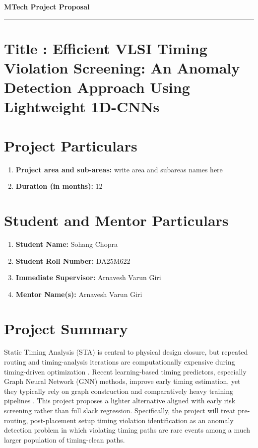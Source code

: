 \documentclass[12pt,a4paper]{article}
\begin{document}
\begin{center}
\textbf{MTech Project Proposal}
\end{center}

\par\noindent\rule{\textwidth}{0.5pt}

\vspace{\baselineskip}
\section{Title : \textnormal{Efficient VLSI Timing Violation Screening: An Anomaly Detection Approach Using Lightweight 1D-CNNs}}

\section{Project Particulars}
\begin{enumerate} [label=(\Alph*)]
    \item \textbf{Project area and sub-areas:}  write area and subareas names here
   \item \textbf{Duration (in months):} 12
\end{enumerate} 


\section{Student and Mentor Particulars}
\begin{enumerate} [label=(\Alph*)]
    \item \textbf{Student Name:} Sohang Chopra
    \item \textbf{Student Roll Number:} DA25M622
    \item \textbf{Immediate Supervisor:} Arnavesh Varun Giri
    \item \textbf{Mentor Name(s):} Arnavesh Varun Giri
\end{enumerate} 
\section{Project Summary}

Static Timing Analysis (STA) is central to physical design closure, but repeated routing and timing-analysis iterations are computationally expensive during timing-driven optimization \cite{Guo2022TimingEngine}. Recent learning-based timing predictors, especially Graph Neural Network (GNN) methods, improve early timing estimation, yet they typically rely on graph construction and comparatively heavy training pipelines \cite{Guo2022TimingEngine,Li2025GATSlack}. This project proposes a lighter alternative aligned with early risk screening rather than full slack regression. Specifically, the project will treat pre-routing, post-placement setup timing violation identification as an anomaly detection problem in which violating timing paths are rare events among a much larger population of timing-clean paths.
\end{document}
